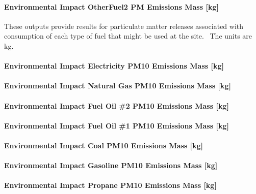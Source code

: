 \paragraph{Environmental Impact OtherFuel2 PM Emissions Mass {[}kg{]}}\label{environmental-impact-otherfuel2-pm-emissions-mass-kg}

These outputs provide results for particulate matter releases associated with consumption of each type of fuel that might be used at the site.~ The units are kg.

\paragraph{Environmental Impact Electricity PM10 Emissions Mass {[}kg{]}}\label{environmental-impact-electricity-pm10-emissions-mass-kg}

\paragraph{Environmental Impact Natural Gas PM10 Emissions Mass {[}kg{]}}\label{environmental-impact-natural-gas-pm10-emissions-mass-kg}

\paragraph{Environmental Impact Fuel Oil \#2 PM10 Emissions Mass {[}kg{]}}\label{environmental-impact-fuel-oil-2-pm10-emissions-mass-kg}

\paragraph{Environmental Impact Fuel Oil \#1 PM10 Emissions Mass {[}kg{]}}\label{environmental-impact-fuel-oil-1-pm10-emissions-mass-kg}

\paragraph{Environmental Impact Coal PM10 Emissions Mass {[}kg{]}}\label{environmental-impact-coal-pm10-emissions-mass-kg}

\paragraph{Environmental Impact Gasoline PM10 Emissions Mass {[}kg{]}}\label{environmental-impact-gasoline-pm10-emissions-mass-kg}

\paragraph{Environmental Impact Propane PM10 Emissions Mass {[}kg{]}}\label{environmental-impact-propane-pm10-emissions-mass-kg}


